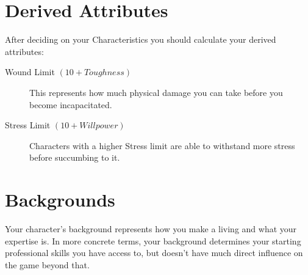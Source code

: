 
\section{Derived Attributes}

After deciding on your Characteristics you should calculate your derived attributes:

\begin{description}

    \item[Wound Limit $(10 + Toughness)$] 
    This represents how much physical damage you can take before you become incapacitated.
    
    \item[Stress Limit $(10 + Willpower)$] 
    Characters with a higher Stress limit are able to withstand more stress before succumbing to it.

\end{description}



\section{Backgrounds}
Your character's background represents how you make a living and what your expertise is.
In more concrete terms, your background determines your starting professional skills you have access to,
but doesn't have much direct influence on the game beyond that. 

